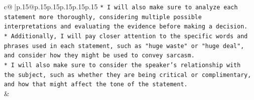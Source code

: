 \documentclass{article}
\begin{document}
{\begin{supertabular}{c@{$\;$}|p{.15\linewidth}@{}p{.15\linewidth}p{.15\linewidth}p{.15\linewidth}p{.15\linewidth}p{.15\linewidth}}
{{{\texttt{* I will also make sure to analyze each statement more thoroughly, considering multiple possible interpretations and evaluating the evidence before making a decision.} \\
\texttt{* Additionally, I will pay closer attention to the specific words and phrases used in each statement, such as "huge waste" or "huge deal", and consider how they might be used to convey sarcasm.} \\
\texttt{* I will also make sure to consider the speaker's relationship with the subject, such as whether they are being critical or complimentary, and how that might affect the tone of the statement.} \\
            }
        }
    }
    & \\ \\

\end{supertabular}
}
\end{document}
